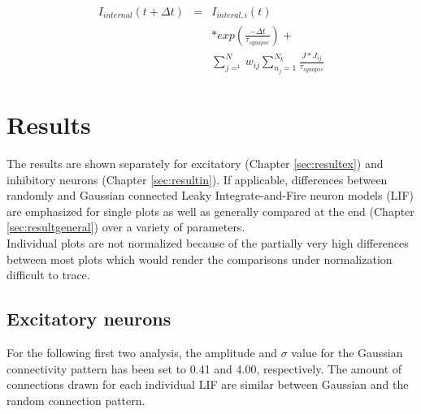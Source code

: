 \documentclass[14pt]{SelfArx} %
\numberwithin{equation}{section}
\begin{document}
\begin{eqnarray}
\label{eq:lifgenfinal}
I_{internal}(t+ \Delta t) &=& I_{interal,i}(t)  \\ 
& &*exp(\frac{- \Delta t}{\tau _{synapse}}) + \nonumber \\
& & \sum_{j=^1}^{N} w_{ij} \sum_{n_{j}=1}^{N_{k}} \frac{J*J_{ij}}{\tau _{synapse}} \nonumber
\end{eqnarray}

\newpage
\section{Results}
The results are shown separately for excitatory (Chapter \ref{sec:resultex}) and inhibitory neurons (Chapter \ref{sec:resultin}).\newline
If applicable, differences between randomly and Gaussian connected Leaky Integrate-and-Fire neuron models (LIF) are emphasized for single plots as well as generally compared at the end (Chapter \ref{sec:resultgeneral}) over a variety of parameters. \\
Individual plots are not normalized because of the partially very high differences between most plots which would render the comparisons under normalization difficult to trace.
\subsection{Excitatory neurons}
For the following first two analysis, the amplitude and $\sigma$ value for the Gaussian connectivity pattern has been set to 0.41 and 4.00, respectively. The amount of connections drawn for each individual LIF are similar between Gaussian and the random connection pattern.
\label{sec:resultex}
\end{document}
